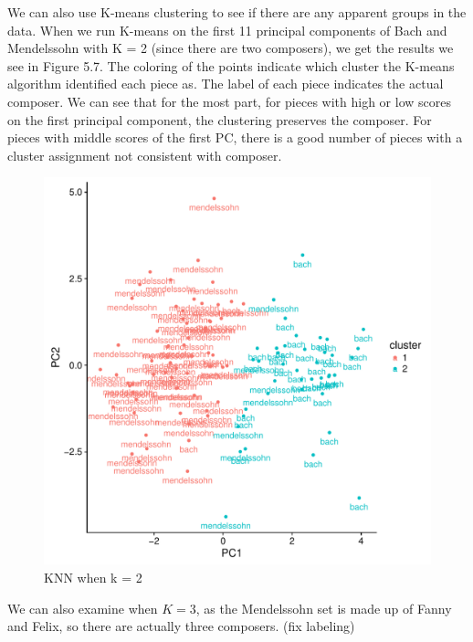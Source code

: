 \documentclass[12pt,twoside]{reedthesis}
\theoremstyle{definition}
\theoremstyle{definition}
\theoremstyle{definition}
\theoremstyle{remark}
\begin{document}
We can also use K-means clustering to see if there are any apparent
groups in the data. When we run K-means on the first 11 principal
components of Bach and Mendelssohn with K = 2 (since there are two
composers), we get the results we see in Figure 5.7. The coloring of the
points indicate which cluster the K-means algorithm identified each
piece as. The label of each piece indicates the actual composer. We can
see that for the most part, for pieces with high or low scores on the
first principal component, the clustering preserves the composer. For
pieces with middle scores of the first PC, there is a good number of
pieces with a cluster assignment not consistent with composer.
\begin{figure}[H]
\centering
\includegraphics[scale = .5]{images/kmeans_2_b.pdf}
\caption{KNN when k = 2}
\label{subd}
\end{figure}
We can also examine when \(K=3\), as the Mendelssohn set is made up of
Fanny and Felix, so there are actually three composers. (fix labeling)
\end{document}
